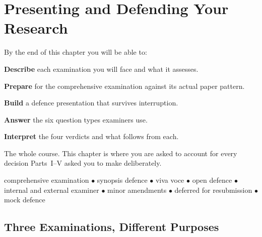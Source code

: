 \chapter{Presenting and Defending Your Research}\label{ch:defending}

\begin{outcomes}
By the end of this chapter you will be able to:
\begin{tight}
  \item \textbf{Describe} each examination you will face and what it assesses.
  \item \textbf{Prepare} for the comprehensive examination against its actual
    paper pattern.
  \item \textbf{Build} a defence presentation that survives interruption.
  \item \textbf{Answer} the six question types examiners use.
  \item \textbf{Interpret} the four verdicts and what follows from each.
\end{tight}
\end{outcomes}

\begin{prereq}
The whole course. This chapter is where you are asked to account for every
decision Parts~I--V asked you to make deliberately.
\end{prereq}

\begin{keyterms}
comprehensive examination $\bullet$ synopsis defence $\bullet$ viva voce
$\bullet$ open defence $\bullet$ internal and external examiner $\bullet$
minor amendments $\bullet$ deferred for resubmission $\bullet$ mock defence
\end{keyterms}

\section{Three Examinations, Different Purposes}

